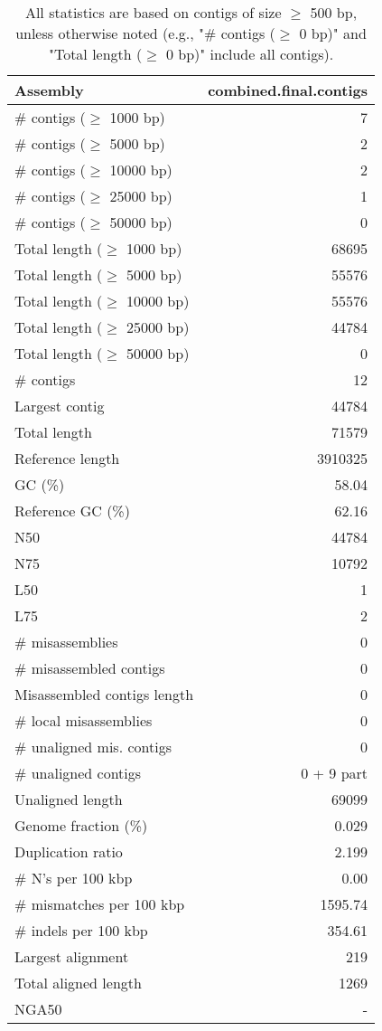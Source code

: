 \documentclass[12pt,a4paper]{article}
\begin{document}
\begin{table}[ht]
\begin{center}
\caption{All statistics are based on contigs of size $\geq$ 500 bp, unless otherwise noted (e.g., "\# contigs ($\geq$ 0 bp)" and "Total length ($\geq$ 0 bp)" include all contigs).}
\begin{tabular}{|l*{1}{|r}|}
\hline
Assembly & combined.final.contigs \\ \hline
\# contigs ($\geq$ 1000 bp) & 7 \\ \hline
\# contigs ($\geq$ 5000 bp) & 2 \\ \hline
\# contigs ($\geq$ 10000 bp) & 2 \\ \hline
\# contigs ($\geq$ 25000 bp) & 1 \\ \hline
\# contigs ($\geq$ 50000 bp) & 0 \\ \hline
Total length ($\geq$ 1000 bp) & 68695 \\ \hline
Total length ($\geq$ 5000 bp) & 55576 \\ \hline
Total length ($\geq$ 10000 bp) & 55576 \\ \hline
Total length ($\geq$ 25000 bp) & 44784 \\ \hline
Total length ($\geq$ 50000 bp) & 0 \\ \hline
\# contigs & 12 \\ \hline
Largest contig & 44784 \\ \hline
Total length & 71579 \\ \hline
Reference length & 3910325 \\ \hline
GC (\%) & 58.04 \\ \hline
Reference GC (\%) & 62.16 \\ \hline
N50 & 44784 \\ \hline
N75 & 10792 \\ \hline
L50 & 1 \\ \hline
L75 & 2 \\ \hline
\# misassemblies & 0 \\ \hline
\# misassembled contigs & 0 \\ \hline
Misassembled contigs length & 0 \\ \hline
\# local misassemblies & 0 \\ \hline
\# unaligned mis. contigs & 0 \\ \hline
\# unaligned contigs & 0 + 9 part \\ \hline
Unaligned length & 69099 \\ \hline
Genome fraction (\%) & 0.029 \\ \hline
Duplication ratio & 2.199 \\ \hline
\# N's per 100 kbp & 0.00 \\ \hline
\# mismatches per 100 kbp & 1595.74 \\ \hline
\# indels per 100 kbp & 354.61 \\ \hline
Largest alignment & 219 \\ \hline
Total aligned length & 1269 \\ \hline
NGA50 & - \\ \hline
\end{tabular}
\end{center}
\end{table}
\end{document}
